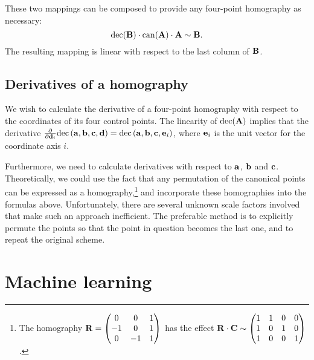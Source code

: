 These two mappings can be composed to provide any four-point homography as necessary:
$$\mathrm{dec}(\mathbf{B}) \cdot \mathrm{can}(\mathbf{A}) \cdot \mathbf{A} \sim \mathbf{B}.$$
The resulting mapping is linear with respect to the last column of $\mathbf{B}$.


\subsection{Derivatives of a homography}
\label{s.homderivatives}

We wish to calculate the derivative of a four-point homography with respect to the coordinates of its four control points.
The linearity of $\mathrm{dec}(\mathbf{A})$ implies that the derivative $\frac{\partial} {\partial \mathbf{d}_i} \mathrm{dec} \left( \mathbf{a}, \mathbf{b}, \mathbf{c}, \mathbf{d} \right) = \mathrm{dec} \left( \mathbf{a}, \mathbf{b}, \mathbf{c}, \mathbf{e}_i \right)$, where $\mathbf{e}_i$ is the unit vector for the coordinate axis $i$.

Furthermore, we need to calculate derivatives with respect to $\mathbf{a}$, $\mathbf{b}$ and $\mathbf{c}$.
Theoretically, we could use the fact that any permutation of the canonical points can be expressed as a homography,\footnote{
The homography $\mathbf{R} = \begin{pmatrix}
 0 & 0 & 1 \\
 -1 & 0 & 1 \\
 0 & -1 & 1
 \end{pmatrix}$ has the effect $\mathbf{R} \cdot \mathbf{C} \sim \begin{pmatrix}
 1 & 1 & 0 & 0 \\
 1 & 0 & 1 & 0 \\
 1 & 0 & 0 & 1
 \end{pmatrix}$.
} and incorporate these homographies into the formulas above.
Unfortunately, there are several unknown scale factors involved that make such an approach inefficient.
The preferable method is to explicitly permute the points so that the point in question becomes the last one, and to repeat the original scheme.


\section{Machine learning}

